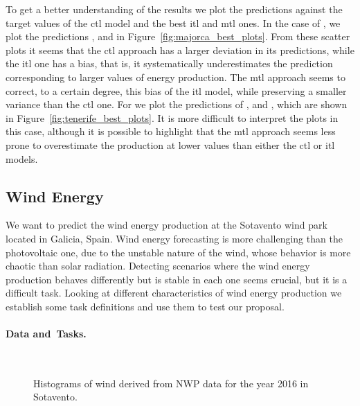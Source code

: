%
To get a better understanding of the results we plot the predictions against the target values of the \acrshort{ctl} model and the best \acrshort{itl} and \acrshort{mtl} ones.
%
In the case of , we plot the predictions ,  and  in Figure~\ref{fig:majorca_best_plots}.
From these scatter plots it seems that the \acrshort{ctl} approach has a larger deviation in its predictions, while the \acrshort{itl} one has a bias, that is, it systematically underestimates the prediction corresponding to larger values of energy production.
The \acrshort{mtl} approach seems to correct, to a certain degree, this bias of the \acrshort{itl} model, while preserving a smaller variance than the \acrshort{ctl} one.
%
For  we plot the predictions of ,  and , which are shown in Figure~\ref{fig:tenerife_best_plots}.
It is more difficult to interpret the plots in this case, although it is possible to highlight that the \acrshort{mtl} approach seems less prone to overestimate the production at lower values than either the \acrshort{ctl} or \acrshort{itl} models.







\subsection{Wind Energy}
We want to predict the wind energy production at the Sotavento wind park located in Galicia, Spain.
Wind energy forecasting is more challenging than the photovoltaic one, due to the unstable nature of the wind, whose behavior is more chaotic than solar radiation. Detecting scenarios where the wind energy production behaves differently but is stable in each one seems crucial, but it is a difficult task. Looking at different characteristics of wind energy production we establish some task definitions and use them to test our proposal. 

\paragraph*{Data and~Tasks.\\}

\begin{figure}[t!]
    \centering%
    \quad%
    \\
 \caption{\label{fig:wind_task_def} Histograms of wind derived from NWP data for the year 2016 in Sotavento.}
\end{figure}

